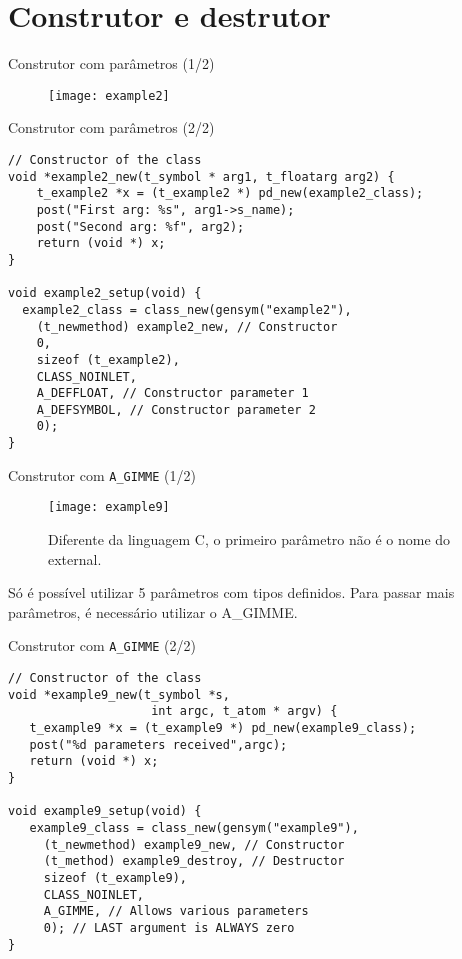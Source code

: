 \section{Construtor e destrutor}


\begin{frame}{Construtor com parâmetros (1/2)}
\begin{figure}
\centering
\texttt{[image: example2]}
\end{figure}
\end{frame}


\begin{frame}[fragile]{Construtor com parâmetros (2/2)}
\begin{lstlisting}
// Constructor of the class
void *example2_new(t_symbol * arg1, t_floatarg arg2) {
    t_example2 *x = (t_example2 *) pd_new(example2_class);
    post("First arg: %s", arg1->s_name);
    post("Second arg: %f", arg2);
    return (void *) x;
}

void example2_setup(void) {
  example2_class = class_new(gensym("example2"),
    (t_newmethod) example2_new, // Constructor
    0,
    sizeof (t_example2),
    CLASS_NOINLET,
    A_DEFFLOAT, // Constructor parameter 1
    A_DEFSYMBOL, // Constructor parameter 2
    0);
}
\end{lstlisting}
\end{frame}


\begin{frame}{Construtor com \texttt{A\_GIMME} (1/2)}
\begin{figure}[h!]
\centering
\texttt{[image: example9]}
\caption{Diferente da linguagem C, o primeiro parâmetro não é o nome do external.}
\end{figure}
Só é possível utilizar 5 parâmetros com tipos definidos.
Para passar mais parâmetros, é necessário utilizar o A\_GIMME.
\end{frame}


\begin{frame}[fragile]{Construtor com \texttt{A\_GIMME} (2/2)}
\begin{lstlisting}
// Constructor of the class
void *example9_new(t_symbol *s,
                    int argc, t_atom * argv) {
   t_example9 *x = (t_example9 *) pd_new(example9_class);
   post("%d parameters received",argc);
   return (void *) x;
}

void example9_setup(void) {
   example9_class = class_new(gensym("example9"),
     (t_newmethod) example9_new, // Constructor
     (t_method) example9_destroy, // Destructor
     sizeof (t_example9),
     CLASS_NOINLET,
     A_GIMME, // Allows various parameters
     0); // LAST argument is ALWAYS zero
}
\end{lstlisting}
\end{frame}


